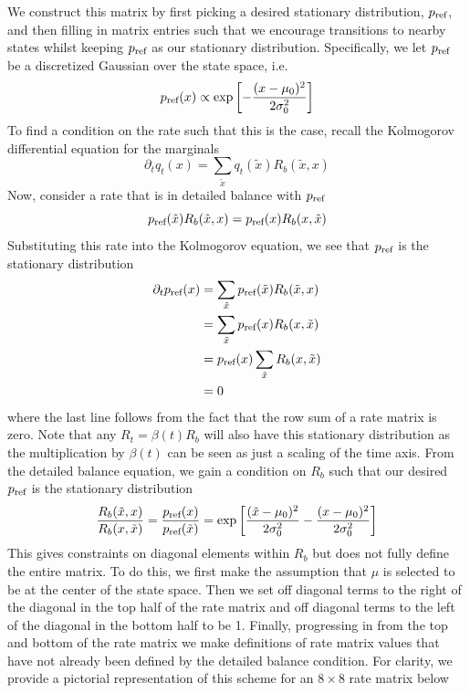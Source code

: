 \documentclass{article}
\begin{document}
We construct this matrix by first picking a desired stationary distribution, $p_{\textrm{ref}}$, and then filling in matrix entries such that we encourage transitions to nearby states whilst keeping $p_{\textrm{ref}}$ as our stationary distribution. Specifically, we let $p_{\textrm{ref}}$ be a discretized Gaussian over the state space, i.e.
\begin{equation}
    p_{\textrm{ref}}(x) \propto \text{exp} \left[ - \frac{(x - \mu_0)^2}{2 \sigma_0^2} \right]
\end{equation}
To find a condition on the rate such that this is the case, recall the Kolmogorov differential equation for the marginals
\begin{equation}
    \partial_t q_t(x) = \sum_{\tilde{x}} q_t(\tilde{x}) R_b(\tilde{x}, x)
\end{equation}
Now, consider a rate that is in detailed balance with $p_{\textrm{ref}}$
\begin{equation}
    p_{\textrm{ref}}(\tilde{x}) R_b(\tilde{x}, x) = p_{\textrm{ref}}(x) R_b(x, \tilde{x})
\end{equation}
Substituting this rate into the Kolmogorov equation, we see that $p_{\textrm{ref}}$ is the stationary distribution
\begin{align}
    \partial_t p_{\textrm{ref}}(x) &= \sum_{\tilde{x}} p_{\textrm{ref}}(\tilde{x}) R_b(\tilde{x}, x)\\
    &= \sum_{\tilde{x}} p_{\textrm{ref}}(x) R_b(x, \tilde{x})\\
    &= p_{\textrm{ref}}(x) \sum_{\tilde{x}} R_b(x, \tilde{x})\\
    &= 0
\end{align}
where the last line follows from the fact that the row sum of a rate matrix is zero. Note that any $R_t = \beta(t) R_b$ will also have this stationary distribution as the multiplication by $\beta(t)$ can be seen as just a scaling of the time axis. From the detailed balance equation, we gain a condition on $R_b$ such that our desired $p_{\textrm{ref}}$ is the stationary distribution
\begin{equation}
    \frac{R_b(\tilde{x}, x)}{R_b(x, \tilde{x})} = \frac{p_{\textrm{ref}}(x)}{p_{\textrm{ref}}(\tilde{x})} = \text{exp} \left[ \frac{(\tilde{x} - \mu_0)^2}{2 \sigma_0^2} - \frac{(x - \mu_0)^2}{2 \sigma_0^2} \right]
\end{equation}
This gives constraints on diagonal elements within $R_b$ but does not fully define the entire matrix. To do this, we first make the assumption that $\mu$ is selected to be at the center of the state space. Then we set off diagonal terms to the right of the diagonal in the top half of the rate matrix and off diagonal terms to the left of the diagonal in the bottom half to be 1. Finally, progressing in from the top and bottom of the rate matrix we make definitions of rate matrix values that have not already been defined by the detailed balance condition.
For clarity, we provide a pictorial representation of this scheme for an $8 \times 8$ rate matrix below
\end{document}
